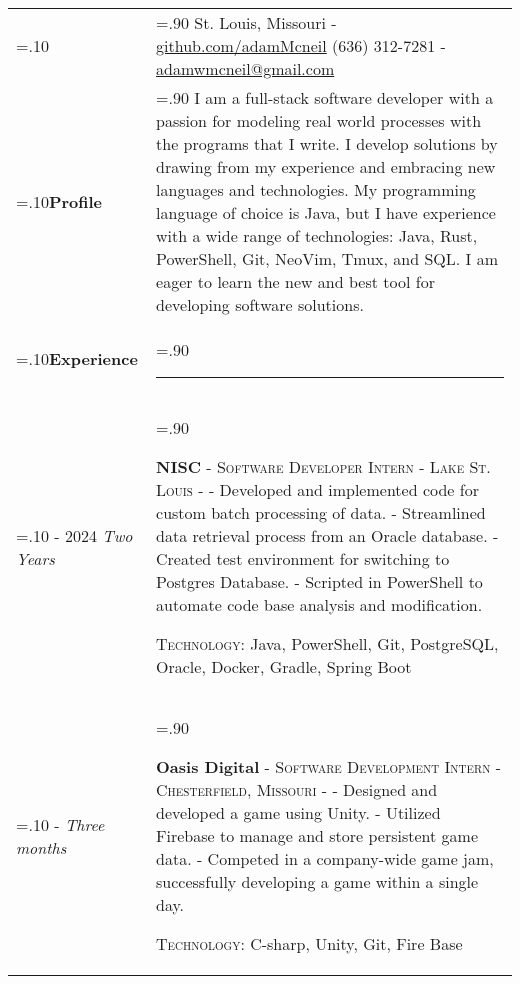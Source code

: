 \documentclass[10pt]{article}
\newcommand{\timeFrame}[3] {
  \if\relax\detokenize{#2}\relax
    #1
  \else
    #1 - #2
  \fi
  \newline
  \scriptsize \textit{#3}
}
\newcommand{\entry}[6] {
  \textbf{#1}
  \if\relax\detokenize{#2}\relax
  \else
       - \textsc{#2}
  \fi
  \if\relax\detokenize{#3}\relax
  \else
      - \textsc{#3}
  \fi
  \if\relax\detokenize{#4}\relax
  \else
      - \href{https://#4}{#4}
  \fi
  \newline #5
  \if\relax\detokenize{#6}\relax
  \else
      \newline \textsc{Technology:} #6
  \fi
  \\
}
\newcommand{\horizontalLine}[0] {
    \noindent\rule{.90\linewidth}{0.4pt}
}
\begin{document}

\begin{tabularx}{\linewidth}{>{\hsize=.10\hsize}X>{\hsize=.90\hsize}X}

{\bfseries\large Adam McNeil} &
St. Louis, Missouri - \href{https://github.com/adamMcneil}{github.com/adamMcneil}\newline
{(636) 312-7281 \hspace{5.5mm} - \href{mailto:adamwmcneil@gmail.com}{adamwmcneil@gmail.com}} \\[5pt]

\textbf{Profile} &
{I am a full-stack software developer with a passion for modeling real world processes with the programs that I write.
 I develop solutions by drawing from my experience and embracing new languages and technologies.
 My programming language of choice is Java, but I have experience with a wide range of technologies: Java, Rust, PowerShell, Git, NeoVim, Tmux, and SQL.
 I am eager to learn the new and best tool for developing software solutions.
 \newline
} \\

\textbf{Experience} & \horizontalLine \\

\timeFrame{2023}{2024}{Two Years} &
\entry{NISC}
  {Software Developer Intern}
  {Lake St. Louis}
  {}
  {
  - Developed and implemented code for custom batch processing of data. \newline
  - Streamlined data retrieval process from an Oracle database. \newline
  - Created test environment for switching to Postgres Database. \newline
  - Scripted in PowerShell to automate code base analysis and modification.
  }
  {Java, PowerShell, Git, PostgreSQL, Oracle, Docker, Gradle, Spring Boot \newline}

\timeFrame{2022}{}{Three months} &
\entry{Oasis Digital}
  {Software Development Intern}
  {Chesterfield, Missouri}
  {}
  {
  - Designed and developed a game using Unity. \newline
  - Utilized Firebase to manage and store persistent game data. \newline
  - Competed in a company-wide game jam, successfully developing a game within a single day.
  }
  {C-sharp, Unity, Git, Fire Base \newline}



\end{tabularx}
\end{document}
